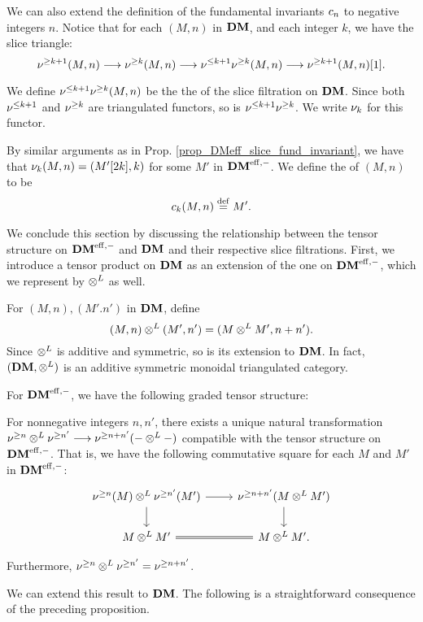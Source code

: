 We can also extend the definition of the fundamental invariants
$c_{n}$ to negative integers $n$. Notice that for each $(M, n)$
in $\mathbf{DM}$, and each integer $k$, we have the slice triangle:
\[
\nu^{\geq k + 1}(M, n) \longrightarrow \nu^{\geq k}(M, n) \longrightarrow \nu^{\leq k + 1}\nu^{\geq k}(M, n)
\longrightarrow \nu^{\geq k + 1}(M, n)[1].
\]

\begin{defn}
We define $\nu^{\leq k + 1}\nu^{\geq k}(M, n)$ be the the  of the slice filtration on $\mathbf{DM}$. Since both $\nu^{\leq k + 1}$ 
and $\nu^{\geq k}$ are triangulated functors, so is $\nu^{\leq k + 1}
\nu^{\geq k}$. We write $\nu_{k}$ for this functor. 

By similar arguments as in Prop. 
\ref{prop_DMeff_slice_fund_invariant}, we have that 
$\nu_{k}(M, n) = (M'[2k], k)$ for some $M'$ in $\mathbf{DM}^{\mathrm{eff},-}$. We 
define the  of $(M, n)$ to be
\[
c_{k}(M, n) \stackrel{\mathrm{def}}{=} M'.
\]
\end{defn}

We conclude this section by discussing the relationship between the
tensor structure on $\mathbf{DM}^{\mathrm{eff},-}$ and $\mathbf{DM}$ and their respective slice 
filtrations. First, we introduce a tensor product on $\mathbf{DM}$ as an 
extension of the one on $\mathbf{DM}^{\mathrm{eff},-}$, which we represent by $\otimes^L$ as
well.

For $(M, n), (M'. n')$ in $\mathbf{DM}$, define 
\[
(M, n) \otimes^L (M', n') = (M \otimes^L M', n + n'). 
\]
Since $\otimes^L$ is additive and symmetric, so is its extension to 
$\mathbf{DM}$. In fact, $(\mathbf{DM}, \otimes^L)$ is an additive symmetric monoidal 
triangulated category.

For $\mathbf{DM}^{\mathrm{eff},-}$, we have the following graded tensor structure:

\begin{prop}\label{prop_tDM_sfilt_DMeff}
For nonnegative integers $n, n'$, there exists a unique natural
transformation $\nu^{\geq n} \otimes^L \nu^{\geq n'} \longrightarrow \nu^{\geq n + n'}(- 
\otimes^L -)$ compatible with the tensor structure on $\mathbf{DM}^{\mathrm{eff},-}$. That 
is, we have the following commutative square for each $M$ and
$M'$ in $\mathbf{DM}^{\mathrm{eff},-}$:
\[
\begin{tikzcd}
\sgDM{n}(M) \tDM \sgDM{n'}(M') \arrow{r} \arrow{d} &
\sgDM{n + n'}(M \tDM M') \arrow{d} \\
M \tDM M' \arrow[equals]{r} &
M \tDM M'.
\end{tikzcd}
\]

Furthermore, $\nu^{\geq n} \otimes^L \nu^{\geq n'} = \nu^{\geq n + n'}$. 
\end{prop}

We can extend this result to $\mathbf{DM}$. The following is a
straightforward consequence of the preceding proposition.

